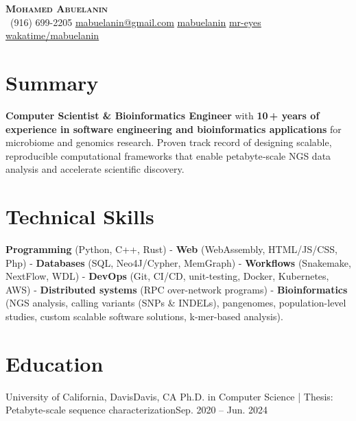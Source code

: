 \documentclass[letterpaper,11pt]{article}
\begin{document}



\begin{center}
    \textbf{\Huge \scshape Mohamed Abuelanin} \\ \vspace{5pt}
     \ \small (916) 699-2205 \quad
    \href{mailto:mabuelanin@gmail.com}{ \underline{mabuelanin@gmail.com}} \quad
    \href{https://www.linkedin.com/in/mabuelanin}{ \underline{mabuelanin}} \quad
    \href{https://github.com/mr-eyes}{ \underline{mr-eyes}} \quad
    \href{https://wakatime.com/@mabuelanin}{\seticon{} \underline{wakatime/mabuelanin}} \quad
\end{center}

\section{Summary}
\textbf{Computer Scientist \& Bioinformatics Engineer} with \textbf{10\,+ years of experience in software engineering and bioinformatics applications} for microbiome and genomics research. Proven track record of designing scalable, reproducible computational frameworks that enable petabyte‑scale NGS data analysis and accelerate scientific discovery.


\section{Technical Skills} 
\textbf{Programming} (Python, C++, Rust) - \textbf{Web} (WebAssembly, HTML/JS/CSS, Php) - \textbf{Databases} (SQL, Neo4J/Cypher, MemGraph) - 
\textbf{Workflows} (Snakemake, NextFlow, WDL) - \textbf{DevOps} (Git, CI/CD, unit-testing, Docker, Kubernetes, AWS) - \textbf{Distributed systems} (RPC over-network programs) - \textbf{Bioinformatics} (NGS analysis, calling variants (SNPs \& INDELs), pangenomes, population-level studies, custom scalable software solutions, k-mer-based analysis).

\section{Education}
  \resumeSubHeadingListStart
    \resumeSubheading
      {University of California, Davis}{Davis, CA}
      {Ph.D. in Computer Science | Thesis: Petabyte-scale sequence characterization}{Sep. 2020 -- Jun. 2024}
\end{document}

